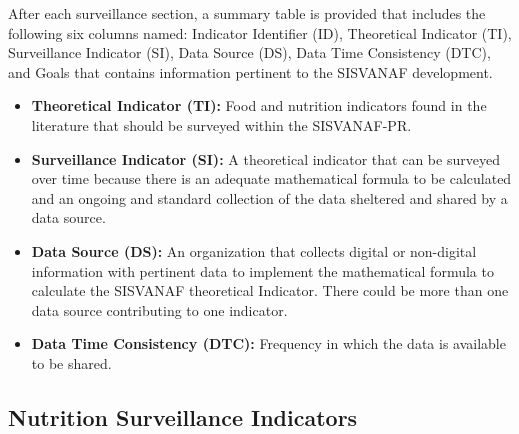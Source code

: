 \documentclass[12pt,letterpaper]{report}
\begin{document}
After each surveillance section, a summary table is provided that includes the following six columns named: Indicator Identifier (ID), Theoretical Indicator (TI), Surveillance Indicator (SI), Data Source (DS), Data Time Consistency (DTC), and Goals that contains information pertinent to the SISVANAF development.

\begin{itemize}

\item\textbf{Theoretical Indicator (TI):}  Food and nutrition indicators found in the literature that should be surveyed within the SISVANAF-PR.
\item\textbf{Surveillance Indicator (SI):} A theoretical indicator that can be surveyed over time because there is an adequate mathematical formula to be calculated and an ongoing and standard collection of the data sheltered and shared by a data source.
\item\textbf{Data Source (DS):} An organization that collects digital or non-digital information with pertinent data to implement the mathematical formula to calculate the SISVANAF theoretical Indicator. There could be more than one data source contributing to one indicator.
\item\textbf{Data Time Consistency (DTC):} Frequency in which the data is available to be shared.
\end{itemize}


\subsection{Nutrition Surveillance Indicators}

\end{document}
